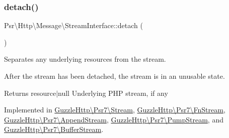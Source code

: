 \mbox{\label{interfacePsr_1_1Http_1_1Message_1_1StreamInterface_a1670dba880a8c14690746732960d4c9c}} 
\subsubsection{\texorpdfstring{detach()}{detach()}}
{\footnotesize\ttfamily Psr\textbackslash{}\+Http\textbackslash{}\+Message\textbackslash{}\+Stream\+Interface\+::detach (\begin{DoxyParamCaption}{ }\end{DoxyParamCaption})}

Separates any underlying resources from the stream.

After the stream has been detached, the stream is in an unusable state.

\begin{DoxyReturn}{Returns}
resource$\vert$null Underlying P\+HP stream, if any 
\end{DoxyReturn}


Implemented in \hyperlink{classGuzzleHttp_1_1Psr7_1_1Stream_a4b82bb1cfca1d5e8939d9717779b870f}{Guzzle\+Http\textbackslash{}\+Psr7\textbackslash{}\+Stream}, \hyperlink{classGuzzleHttp_1_1Psr7_1_1FnStream_a0de4cb9ea46e419a73c9005d8fe93867}{Guzzle\+Http\textbackslash{}\+Psr7\textbackslash{}\+Fn\+Stream}, \hyperlink{classGuzzleHttp_1_1Psr7_1_1AppendStream_aa62ff3e927b78109c54708c10f124de0}{Guzzle\+Http\textbackslash{}\+Psr7\textbackslash{}\+Append\+Stream}, \hyperlink{classGuzzleHttp_1_1Psr7_1_1PumpStream_a6e913458fb2c2b7ca51f600d466dcc19}{Guzzle\+Http\textbackslash{}\+Psr7\textbackslash{}\+Pump\+Stream}, and \hyperlink{classGuzzleHttp_1_1Psr7_1_1BufferStream_ae378709ce9283164cafbfe1b1fcf4190}{Guzzle\+Http\textbackslash{}\+Psr7\textbackslash{}\+Buffer\+Stream}.

\mbox{\label{interfacePsr_1_1Http_1_1Message_1_1StreamInterface_a502cc5ca370c6925b78d95d86d68777c}} 
